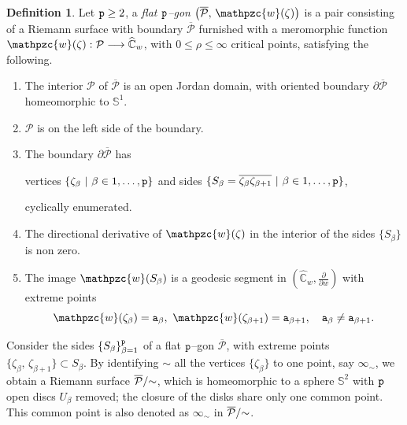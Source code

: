 \documentclass[final,3p,times]{elsarticle}
\newcommand{\CW}{\ensuremath{{\widehat{\mathbb C}}}}
\newcommand{\esf}{\ensuremath{{\mathbb S}^2}}
\newcommand{\del}[2]{\frac{\partial #1}{\partial #2}}
\theoremstyle{definition}
\newtheorem{definition}[theorem]{Definition}
\begin{document}
\begin{definition}
\label{def:poligono}
Let ${\tt p}\geq 2$, a \emph{flat $\tt p$--gon  
$\big(\overline{\mathcal{P}}, \, \mathpzc{w} (\zeta) \big)$} 
is a pair consisting of a Riemann surface with boundary $\overline{\mathcal{P}}$ 
furnished with a meromorphic function 
$\mathpzc{w} (\zeta): \mathcal{P} \longrightarrow \CW_w$,
with 
$0 \leq \rho \leq \infty$ critical points,
satisfying the following.

\begin{enumerate}[label=\roman*),leftmargin=*] 
\item
The interior $\mathcal{P}$ of $\overline{\mathcal{P}}$ 
is an open Jordan domain, with oriented
boundary $\partial \overline{\mathcal{P}}$ homeomorphic to $\mathbb{S}^1$. 


\item 
$\mathcal{P}$ is on the left side of the boundary.


\item
The boundary $\partial \overline{\mathcal{P}}$ has 

\centerline{
vertices $\{  \zeta _\beta 
\ \vert \ \beta \in 1, \ldots , {\tt p} \}$
and sides
$\{ S_{\beta} = 
\overline{\zeta_\beta \zeta_{\beta+1}}  
\ \vert \ \beta \in 1, \ldots , {\tt p} \}$, }

\noindent
cyclically enumerated.

\item 
The directional derivative of $ \mathpzc{w}(\zeta)$
in the interior of the sides $\{ S_{\beta} \}$
is non zero. 


\item 
The image $ \mathpzc{w}(S_{\beta})$
is a geodesic segment in $(\CW_w, \del{}{w})$
with extreme points 
$$ 
\mathpzc{w}(\zeta_\beta) = {\tt a}_\beta, \
\mathpzc{w}(\zeta_{\beta+1}) = {\tt a}_{\beta+1}, 
\ \ \ 
{\tt a}_{\beta}\neq {\tt a}_{\beta+1}.
$$
\end{enumerate}
\end{definition}

Consider the sides
$\{ S_\beta \}_{\beta =1}^{\tt p}$ 
of a flat ${\tt p}$--gon 
$\overline{\mathcal{P}}$, 
with extreme points $\{ \zeta_\beta, \, \zeta_{\beta +1} \} \subset 
S_\beta$. 
By identifying $\sim$
all the vertices  $\{ \zeta_\beta\} $
to one point, say $\infty_\sim$, we obtain
a Riemann surface $\overline{\mathcal{P}}/\hspace{-.1cm}\sim$, which is 
homeomorphic to a sphere $\esf$ with $\tt p$ open discs
$U_\beta$ removed; 
the closure of the disks
share only one common point. 
This common point is also denoted as $\infty_\sim$ 
in $\overline{\mathcal{P}}/\hspace{-.1cm}\sim$.
\end{document}
